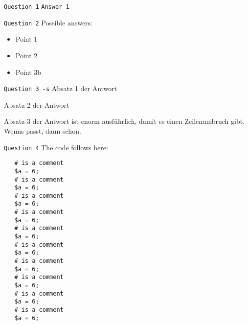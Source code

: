


\texttt{Question 1}
\texttt{Answer 1}



\texttt{Question 2}
Possible answers:
\begin{itemize}
\item Point 1
\item Point 2
\item Point 3b
\end{itemize}



\texttt{Question 3 -s}
Absatz 1 der Antwort

Absatz 2 der Antwort

Absatz 3 der Antwort ist enorm ausführlich, damit es einen Zeilenumbruch gibt. Wenns passt, dann schon.



\texttt{Question 4}
The code follows here:
\begin{verbatim}
   # is a comment
   $a = 6;
   # is a comment
   $a = 6;
   # is a comment
   $a = 6;
   # is a comment
   $a = 6;
   # is a comment
   $a = 6;
   # is a comment
   $a = 6;
   # is a comment
   $a = 6;
   # is a comment
   $a = 6;
   # is a comment
   $a = 6;
   # is a comment
   $a = 6;
\end{verbatim}



